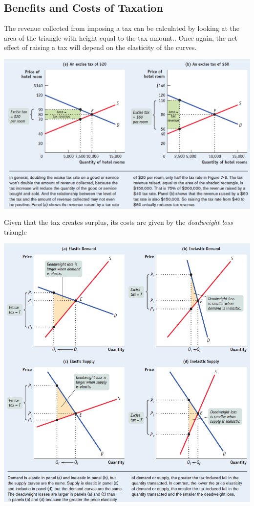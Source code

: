 \documentclass[english,course, draft]{Notes}
\newcommand{\ita}[1]{\textit{#1}}
\begin{document}
\subsection{Benefits and Costs of Taxation}

\par{The revenue collected from imposing a tax can be calculated by looking at the area of the triangle with height equal to the tax amount.. Once again, the net effect of raising a tax will depend on the elasticity of the curves.}

\includegraphics[width=\textwidth]{tax4}

\par{Given that the tax creates surplus, its costs are given by the \ita{deadweight loss} triangle}

\includegraphics[scale=0.5]{tax5}
\end{document}
